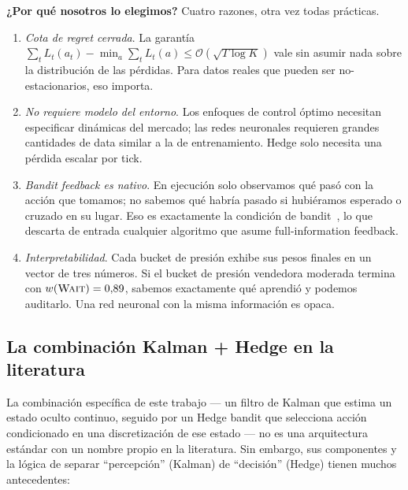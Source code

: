 \documentclass[journal,onecolumn,11pt]{IEEEtran}
\begin{document}
\noindent
\textbf{¿Por qué nosotros lo elegimos?} Cuatro razones, otra vez todas
prácticas.
\begin{enumerate}
\item \emph{Cota de regret cerrada}. La garantía
      $\sum_t L_t(a_t) - \min_a \sum_t L_t(a) \leq \mathcal{O}(\sqrt{T\log K})$
      vale sin asumir nada sobre la distribución de las pérdidas.
      Para datos reales que pueden ser no-estacionarios, eso importa.
\item \emph{No requiere modelo del entorno}. Los enfoques de
      control óptimo necesitan especificar dinámicas del mercado;
      las redes neuronales requieren grandes cantidades de data
      similar a la de entrenamiento. Hedge solo necesita una
      pérdida escalar por tick.
\item \emph{Bandit feedback es nativo}. En ejecución solo
      observamos qué pasó con la acción que tomamos; no sabemos
      qué habría pasado si hubiéramos esperado o cruzado en su
      lugar. Eso es exactamente la condición de
      bandit~\cite{auer2002}, lo que descarta de entrada
      cualquier algoritmo que asume full-information feedback.
\item \emph{Interpretabilidad}. Cada bucket de presión exhibe sus
      pesos finales en un vector de tres números. Si el bucket de
      presión vendedora moderada termina con
      $w(\textsc{Wait})=0{,}89$, sabemos exactamente qué aprendió y
      podemos auditarlo. Una red neuronal con la misma información
      es opaca.
\end{enumerate}

\subsection{La combinación Kalman + Hedge en la literatura}

La combinación específica de este trabajo --- un filtro de Kalman que
estima un estado oculto continuo, seguido por un Hedge bandit que
selecciona acción condicionado en una discretización de ese estado
--- no es una arquitectura estándar con un nombre propio en la
literatura. Sin embargo, sus componentes y la lógica de separar
``percepción'' (Kalman) de ``decisión'' (Hedge) tienen muchos
antecedentes:
\end{document}
